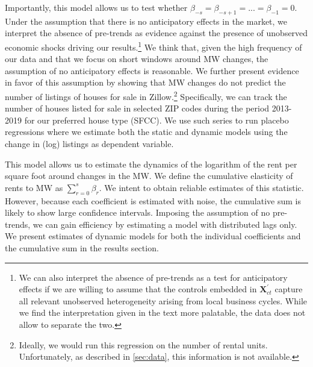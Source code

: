 Importantly, this model allows us to test whether $\beta_{-s} = \beta_{-s+1} = ... = \beta_{-1} 
= 0$. Under the assumption that there is no anticipatory effects in the market, we interpret the 
absence of pre-trends as evidence against the presence of unobserved economic shocks driving our 
results.\footnote{We can also interpret the absence of pre-trends as a test for anticipatory
	effects if we are willing to assume that the controls embedded in $\mathbf{X}^{'}_{ct}$ 
	capture all relevant unobserved heterogeneity arising from local business cycles. While we 
	find the interpretation given in the text more palatable, the data does not allow to separate 
	the two.} 
We think that, given the high frequency of our data and that we focus on short windows around MW 
changes, the assumption of no anticipatory effects is reasonable. We further present evidence in 
favor of this assumption by showing that MW changes do not predict the number of listings of 
houses for sale in Zillow.\footnote{Ideally, we would run this regression on the number of rental 
	units. Unfortunately, as described in \autoref{sec:data}, this information is not available.}
Specifically, we can track the number of houses listed for sale in selected ZIP codes during the 
period 2013-2019 for our preferred house type (SFCC). We use such series to run placebo 
regressions where we estimate both the static and dynamic models using the change in (log) 
listings as dependent variable. %

This model allows us to estimate the dynamics of the logarithm of the rent per square foot around 
changes in the MW. We define the cumulative elasticity of rents to MW as $\sum_{r=0}^s \beta_r$. 
We intent to obtain reliable estimates of this statistic. However, because each coefficient is 
estimated with noise, the cumulative sum is likely to show large confidence intervals. Imposing 
the assumption of no pre-trends, we can gain efficiency by estimating a model with distributed 
lags only. We present estimates of dynamic models for both the individual coefficients and the 
cumulative sum in the results section.


